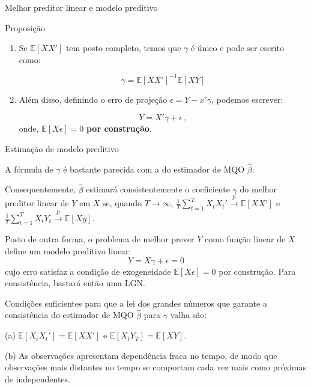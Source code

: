 \documentclass[11pt]{beamer}
\newenvironment{halfwideitemize}{\itemize\addtolength{\itemsep}{0.5em}}{\enditemize}
\begin{document}
	\begin{frame}{Melhor preditor linear e modelo preditivo}
			\begin{block}{Proposição}
			\begin{enumerate}
				\item 		Se $\mathbb{E}[XX']$ tem posto completo, temos que $\gamma$ é único e pode ser escrito como:
				
				$$\gamma = \mathbb{E}[XX']^{-1}\mathbb{E}[XY]$$
				
				\item Além disso, definindo o erro de projeção $\epsilon = Y- x'\gamma$, podemos escrever:
				
				$$Y = X'\gamma + \epsilon \, ,$$
				onde, $\mathbb{E}[X \epsilon] = 0$ \textbf{por construção}.
				
			\end{enumerate}
			
		\end{block}
	\end{frame}
	\begin{frame}{Estimação de modelo preditivo}
		\begin{halfwideitemize}
			\item A fórmula de $\gamma$ é bastante parecida com a do estimador de MQO $\hat{\beta}$.
			\begin{halfwideitemize}
				\item Consequentemente, $\hat{\beta}$ estimará consistentemente o coeficiente $\gamma$ do melhor preditor linear de $Y$ em $X$ se, quando $T \to \infty$, $\frac{1}{T}\sum_{t=1}^T X_t X_t' \overset{p}{\to} \mathbb{E}[XX']$ e $\frac{1}{T}\sum_{t=1}^T X_t Y_t \overset{p}{\to} \mathbb{E}[X y]$.
			\end{halfwideitemize}
			\item Posto de outra forma, o problema de melhor prever $Y$ como função linear de $X$ define um {\color{blue}modelo preditivo linear}:
			$$Y = X\gamma + \epsilon = 0$$
			cujo erro satisfaz a condição de exogeneidade $\mathbb{E}[X\epsilon] = 0$ {\color{red}por construção}. Para consistência, bastará então uma LGN.
		\end{halfwideitemize}
			\begin{halfwideitemize}
			\item Condições suficientes para que a lei dos grandes números que garante a consistência do estimador de MQO $\hat{\beta}$ para $\gamma$ valha são:
			\begin{halfwideitemize}
				\item[(a)] $\mathbb{E}[X_t X_t'] = \mathbb{E}[XX']$ e $\mathbb{E}[X_t Y_T]=\mathbb{E}[X Y]$.
				\item[(b)] {\color{blue}As observações apresentam dependência fraca no tempo}, de modo que observações mais distantes no tempo se comportam cada vez mais como próximas de independentes.
			\end{halfwideitemize}
		\end{halfwideitemize}
	\end{frame}
\end{document}
